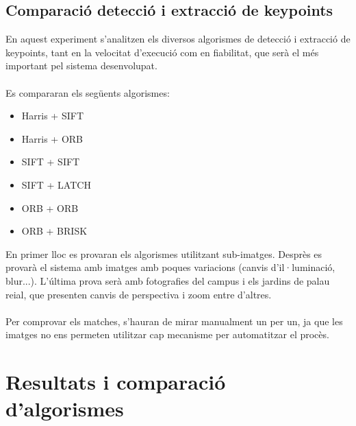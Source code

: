 	\subsection{Comparació detecció i extracció de keypoints}
		En aquest experiment s'analitzen els diversos algorismes de detecció i extracció de keypoints, tant en la velocitat d'execució com en fiabilitat, que serà el més important pel sistema desenvolupat.\\\\
		Es compararan els següents algorismes:
		\begin{multicols}{3} 
			\begin{itemize}
				\item{Harris + SIFT}
				\item{Harris + ORB}
				\item{SIFT + SIFT}
				\item{SIFT + LATCH}
				\item{ORB + ORB}
				\item{ORB + BRISK}
			\end{itemize}
		\end{multicols}
		\noindent
		En primer lloc es provaran els algorismes utilitzant sub-imatges. Desprès es provarà el sistema amb imatges amb poques variacions (canvis d'il·luminació, blur...). L'última prova serà amb fotografies
		del campus i els jardins de palau reial, que presenten canvis de perspectiva i zoom entre d'altres.\\\\
		Per comprovar els matches, s'hauran de mirar manualment un per un, ja que les imatges no ens permeten utilitzar cap mecanisme per automatitzar el procès.
\newpage
\section{Resultats i comparació d'algorismes}

